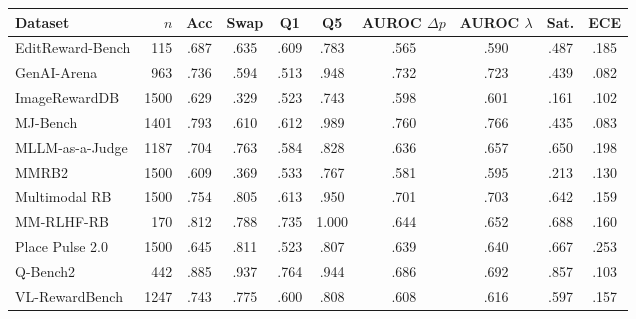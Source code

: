 \begin{tabular}{lrcccccccc}
\toprule
Dataset & $n$ & Acc & Swap & Q1 & Q5 & AUROC $\Delta p$ & AUROC $\lambda$ & Sat. & ECE\\
\midrule
EditReward-Bench & 115 & .687 & .635 & .609 & .783 & .565 & .590 & .487 & .185\\
GenAI-Arena & 963 & .736 & .594 & .513 & .948 & .732 & .723 & .439 & .082\\
ImageRewardDB & 1500 & .629 & .329 & .523 & .743 & .598 & .601 & .161 & .102\\
MJ-Bench & 1401 & .793 & .610 & .612 & .989 & .760 & .766 & .435 & .083\\
MLLM-as-a-Judge & 1187 & .704 & .763 & .584 & .828 & .636 & .657 & .650 & .198\\
MMRB2 & 1500 & .609 & .369 & .533 & .767 & .581 & .595 & .213 & .130\\
Multimodal RB & 1500 & .754 & .805 & .613 & .950 & .701 & .703 & .642 & .159\\
MM-RLHF-RB & 170 & .812 & .788 & .735 & 1.000 & .644 & .652 & .688 & .160\\
Place Pulse 2.0 & 1500 & .645 & .811 & .523 & .807 & .639 & .640 & .667 & .253\\
Q-Bench2 & 442 & .885 & .937 & .764 & .944 & .686 & .692 & .857 & .103\\
VL-RewardBench & 1247 & .743 & .775 & .600 & .808 & .608 & .616 & .597 & .157\\
\bottomrule
\end{tabular}
